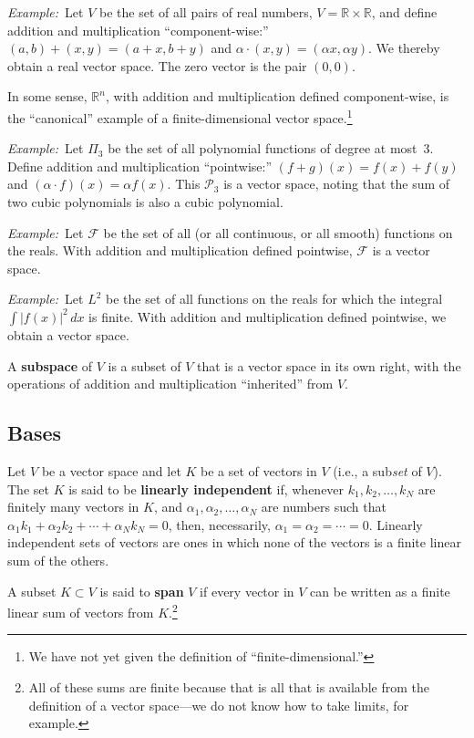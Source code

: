 \documentclass[10pt, a4paper, twocolumn]{article}
\newcommand{\R}{\mathbb{R}}
\newcommand{\defn}[1]{\textbf{#1}}
\newcommand{\eg}{\emph{Example:}\relax}
\begin{document}
\eg\ Let $V$ be the set of all pairs of real numbers, $V = \R \times \R$, and define addition and
multiplication “component-wise:” $(a, b) + (x, y) = (a + x, b + y)$ and $\alpha \cdot (x, y) = (\alpha x, \alpha y)$. We
thereby obtain a real vector space. The zero vector is the pair $(0, 0)$.

In some sense, $\R^n$, with addition and multiplication defined component-wise, is the “canonical”
example of a finite-dimensional vector space.\footnote{We have not yet given the definition of
  “finite-dimensional.”}

\eg\ Let $\Pi_3$ be the set of all polynomial functions of degree at most~3. Define addition and
multiplication “pointwise:” $(f + g)(x) = f(x) + f(y)$ and $(\alpha \cdot f)(x) = \alpha f(x)$. This $\mathcal{P}_3$ is a vector
space, noting that the sum of two cubic polynomials is also a cubic polynomial.

\eg\ Let $\mathcal{F}$ be the set of all (or all continuous, or all smooth) functions on the reals. With
addition and multiplication defined pointwise, $\mathcal{F}$ is a vector space.

\eg\ Let $L^2$ be the set of all functions on the reals for which the integral $\int |f(x)|^2\,dx$
is finite. With addition and multiplication defined pointwise, we obtain a vector space.  

A \defn{subspace} of $V$ is a subset of $V$ that is a vector space in its own right, with the
operations of addition and multiplication “inherited” from $V$.

\subsection{Bases}

Let $V$ be a vector space and let $K$ be a set of vectors in $V$ (i.e., a sub\emph{set} of $V$). The
set $K$ is said to be \defn{linearly independent} if, whenever $k_1, k_2, \dotsc, k_N$ are finitely
many vectors in $K$, and $\alpha_1, \alpha_2, \dotsc, \alpha_N$ are numbers such that $\alpha_1 k_1 + \alpha_2 k_2 + \dotsb +
\alpha_N k_N = 0$, then, necessarily, $\alpha_1 = \alpha_2 = \dotsb = 0$. Linearly independent sets of vectors are
ones in which none of the vectors is a finite linear sum of the others.

A subset $K \subset V$ is said to \defn{span} $V$ if every vector in $V$ can be written as a finite linear sum
of vectors from $K$.\footnote{All of these sums are finite because that is all that is available from
  the definition of a vector space---we do not know how to take limits, for example.}
\end{document}
